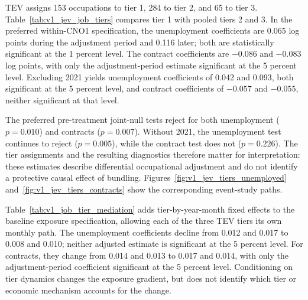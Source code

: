 TEV assigns 153 occupations to tier 1, 284 to tier 2, and 65 to tier 3. Table~\ref{tab:v1_jev_job_tiers} compares tier 1 with pooled tiers 2 and 3. In the preferred within-CNO1 specification, the unemployment coefficients are 0.065 log points during the adjustment period and 0.116 later; both are statistically significant at the 1 percent level. The contract coefficients are $-0.086$ and $-0.083$ log points, with only the adjustment-period estimate significant at the 5 percent level. Excluding 2021 yields unemployment coefficients of 0.042 and 0.093, both significant at the 5 percent level, and contract coefficients of $-0.057$ and $-0.055$, neither significant at that level.

The preferred pre-treatment joint-null tests reject for both unemployment ($p=0.010$) and contracts ($p=0.007$). Without 2021, the unemployment test continues to reject ($p=0.005$), while the contract test does not ($p=0.226$). The tier assignments and the resulting diagnostics therefore matter for interpretation: these estimates describe differential occupational adjustment and do not identify a protective causal effect of bundling. Figures~\ref{fig:v1_jev_tiers_unemployed} and~\ref{fig:v1_jev_tiers_contracts} show the corresponding event-study paths.

Table~\ref{tab:v1_job_tier_mediation} adds tier-by-year-month fixed effects to the baseline exposure specification, allowing each of the three TEV tiers its own monthly path. The unemployment coefficients decline from 0.012 and 0.017 to 0.008 and 0.010; neither adjusted estimate is significant at the 5 percent level. For contracts, they change from 0.014 and 0.013 to 0.017 and 0.014, with only the adjustment-period coefficient significant at the 5 percent level. Conditioning on tier dynamics changes the exposure gradient, but does not identify which tier or economic mechanism accounts for the change.
